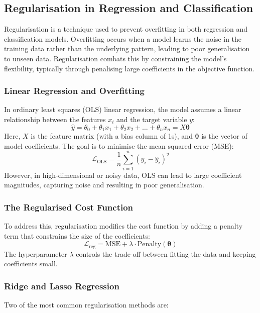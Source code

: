 \documentclass[9pt]{extarticle}
\begin{document}
\subsection{Regularisation in Regression and Classification}

Regularisation is a technique used to prevent overfitting in both regression and classification models. Overfitting occurs when a model learns the noise in the training data rather than the underlying pattern, leading to poor generalisation to unseen data. Regularisation combats this by constraining the model’s flexibility, typically through penalising large coefficients in the objective function.

\subsubsection*{Linear Regression and Overfitting}

In ordinary least squares (OLS) linear regression, the model assumes a linear relationship between the features $x_i$ and the target variable $y$:
\[
\hat{y} = \theta_0 + \theta_1 x_1 + \theta_2 x_2 + \dots + \theta_n x_n = X\boldsymbol{\theta}
\]
Here, $X$ is the feature matrix (with a bias column of 1s), and $\boldsymbol{\theta}$ is the vector of model coefficients. The goal is to minimise the mean squared error (MSE):
\[
\mathcal{L}_{\text{OLS}} = \frac{1}{n} \sum_{i=1}^n \left(y_i - \hat{y}_i\right)^2
\]
However, in high-dimensional or noisy data, OLS can lead to large coefficient magnitudes, capturing noise and resulting in poor generalisation.

\subsubsection*{The Regularised Cost Function}

To address this, regularisation modifies the cost function by adding a penalty term that constrains the size of the coefficients:
\[
\mathcal{L}_{\text{reg}} = \text{MSE} + \lambda \cdot \text{Penalty}(\boldsymbol{\theta})
\]
The hyperparameter $\lambda$ controls the trade-off between fitting the data and keeping coefficients small.

\subsubsection*{Ridge and Lasso Regression}

Two of the most common regularisation methods are:
\end{document}
